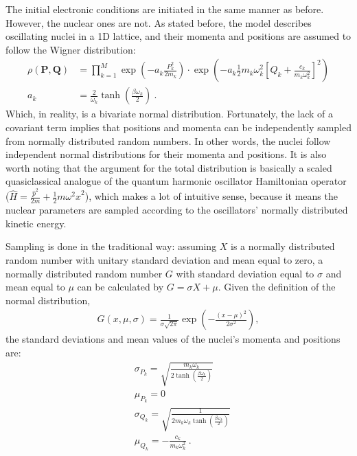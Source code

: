 The initial electronic conditions are initiated in the same manner as before. However, the nuclear ones are not. As stated before, the model describes oscillating nuclei in a 1D lattice, and their momenta and positions are assumed to follow the Wigner distribution:
\begin{subequations}
\begin{align}
\rho(\bm{P},\bm{Q}) &= \prod\limits_{k=1}^{M} \exp\left(-a_{k} \frac{P_{k}^{2}}{2 m_{k}}\right)\cdot
\exp\left(-a_{k} \frac{1}{2} m_{k} \omega_{k}^{2} \left[Q_{k} + \frac{c_{k}}{m_{k} \omega_{k}^{2}}\right]^{2} \right)\\
a_{k} &= \frac{2}{\omega_{k}} \tanh\left(\frac{\beta \omega_{k}}{2}\right)~.
\end{align}
\end{subequations}
Which, in reality, is a bivariate normal distribution. Fortunately, the lack of a covariant term implies that positions and momenta can be independently sampled from normally distributed random numbers. In other words, the nuclei follow independent normal distributions for their momenta and positions. It is also worth noting that the argument for the total distribution is basically a scaled quasiclassical analogue of the quantum harmonic oscillator Hamiltonian operator ($ \hat{H} = \frac{\hat{p}^{2}}{2m} + \frac{1}{2} m \omega^{2} \hat{x}^{2}$), which makes a lot of intuitive sense, because it means the nuclear parameters are sampled according to the oscillators' normally distributed kinetic energy.

Sampling is done in the traditional way: assuming $ X $ is a normally distributed random number with unitary standard deviation and mean equal to zero, a normally distributed random number $ G $ with standard deviation equal to $ \sigma $ and mean equal to $ \mu $ can be calculated by $ G = \sigma X + \mu $. Given the definition of the normal distribution,
\begin{align}
G(x, \mu, \sigma) = \frac{1}{\sigma \sqrt{2\pi}} \exp\left(- \frac{(x-\mu)^{2}}{2 \sigma^{2}}\right),
\end{align}
the standard deviations and mean values of the nuclei's momenta and positions are:
\begin{subequations}
\begin{align}
&\sigma_{P_{k}} = \sqrt{\frac{m_{k} \omega_{k}}{2 \tanh\left(\frac{\beta \omega_{k}}{2}\right)}}\\
&\mu_{P_{k}} = 0\\
&\sigma_{Q_{k}} = \sqrt{\frac{1}{2 m_{k} \omega_{k} \tanh\left(\frac{\beta \omega_{k}}{2}\right)}}\\
&\mu_{Q_{k}} = -\frac{c_{k}}{m_{k} \omega_{k}^{2}}~.
\end{align}
\end{subequations}
%
